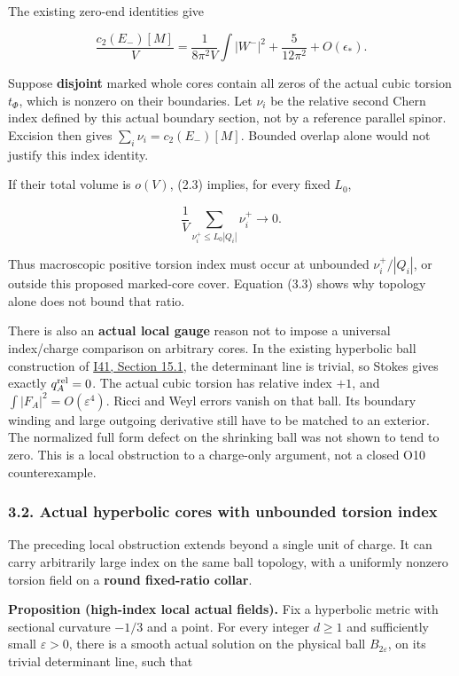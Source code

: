 \documentclass[
  10pt,
]{article}
\begin{document}
The existing zero-end identities give

\[
 \frac{c_2(E_-)[M]}V
   =\frac1{8\pi^2V}\int|W^-|^2
                      +\frac5{12\pi^2}+O(\epsilon_*).
 \tag{3.4}
\]

Suppose \textbf{disjoint} marked whole cores contain all zeros of the
actual cubic torsion \(t_\Phi\), which is nonzero on their boundaries.
Let \(\nu_i\) be the relative second Chern index defined by this actual
boundary section, not by a reference parallel spinor. Excision then
gives \(\sum_i\nu_i=c_2(E_-)[M]\). Bounded overlap alone would not
justify this index identity.

If their total volume is \(o(V)\), (2.3) implies, for every fixed
\(L_0\),

\[
 \frac1V\sum_{\nu_i^+\le L_0|Q_i|}\nu_i^+\longrightarrow0.
 \tag{3.5}
\]

Thus macroscopic positive torsion index must occur at unbounded
\(\nu_i^+/|Q_i|\), or outside this proposed marked-core cover. Equation
(3.3) shows why topology alone does not bound that ratio.

There is also an \textbf{actual local gauge} reason not to impose a
universal index/charge comparison on arbitrary cores. In the existing
hyperbolic ball construction of
\href{20260927_conformal_separation_and_zero_end.md}{I41, Section 15.1},
the determinant line is trivial, so Stokes gives exactly
\(q_A^{\rm rel}=0\). The actual cubic torsion has relative index \(+1\),
and \(\int|F_A|^2=O(\varepsilon^4)\). Ricci and Weyl errors vanish on
that ball. Its boundary winding and large outgoing derivative still have
to be matched to an exterior. The normalized full form defect on the
shrinking ball was not shown to tend to zero. This is a local
obstruction to a charge-only argument, not a closed O10 counterexample.

\hypertarget{actual-hyperbolic-cores-with-unbounded-torsion-index}{%
\subsubsection{3.2. Actual hyperbolic cores with unbounded torsion
index}\label{actual-hyperbolic-cores-with-unbounded-torsion-index}}

The preceding local obstruction extends beyond a single unit of charge.
It can carry arbitrarily large index on the same ball topology, with a
uniformly nonzero torsion field on a \textbf{round fixed-ratio collar}.

\textbf{Proposition (high-index local actual fields).} Fix a hyperbolic
metric with sectional curvature \(-1/3\) and a point. For every integer
\(d\ge1\) and sufficiently small \(\varepsilon>0\), there is a smooth
actual solution on the physical ball \(B_{2\varepsilon}\), on its
trivial determinant line, such that
\end{document}
